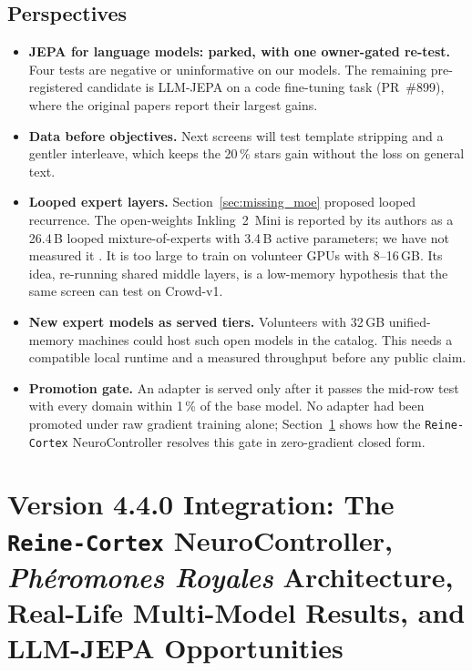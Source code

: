 \documentclass[11pt,a4paper]{article}
\begin{document}
\subsection{Perspectives}
\begin{itemize}[leftmargin=*,itemsep=2pt]
  \item \textbf{JEPA for language models: parked, with one owner-gated re-test.} Four tests are negative or
    uninformative on our models. The remaining pre-registered candidate is LLM-JEPA on a code fine-tuning task (PR~\#899),
    where the original papers report their largest gains.
  \item \textbf{Data before objectives.} Next screens will test template stripping and a gentler interleave, which
    keeps the 20\,\% stars gain without the loss on general text.
  \item \textbf{Looped expert layers.} Section~\ref{sec:missing_moe} proposed looped recurrence. The open-weights
    Inkling~2~Mini is reported by its authors as a 26.4\,B looped mixture-of-experts with 3.4\,B active parameters; we
    have not measured it \cite{inkling2mini2026}. It is too large to train on volunteer GPUs with 8--16\,GB. Its idea,
    re-running shared middle layers, is a low-memory hypothesis that the same screen can test on Crowd-v1.
  \item \textbf{New expert models as served tiers.} Volunteers with 32\,GB unified-memory machines could host such
    open models in the catalog. This needs a compatible local runtime and a measured throughput before any public claim.
  \item \textbf{Promotion gate.} An adapter is served only after it passes the mid-row test with every domain within
    1\,\% of the base model. No adapter had been promoted under raw gradient training alone; Section~\ref{sec:v440_reine_cortex_pheromones_jepa} shows how the \texttt{Reine-Cortex} NeuroController resolves this gate in zero-gradient closed form.
\end{itemize}

\section{Version 4.4.0 Integration: The \texttt{Reine-Cortex} NeuroController, \emph{Ph\'eromones Royales} Architecture, Real-Life Multi-Model Results, and LLM-JEPA Opportunities}
\label{sec:v440_reine_cortex_pheromones_jepa}
\end{document}
